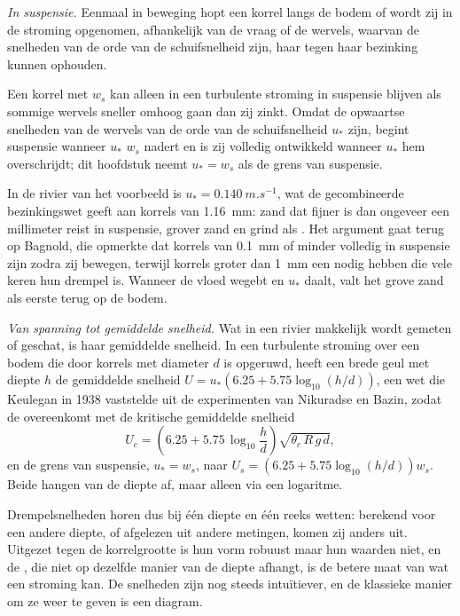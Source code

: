 \emph{In suspensie.} Eenmaal in beweging hopt een korrel langs de bodem of wordt zij in de stroming opgenomen, afhankelijk van de vraag of de wervels, waarvan de snelheden van de orde van de schuifsnelheid zijn, haar tegen haar bezinking kunnen ophouden.

\begin{proposition}\label{prop:b1:erosion-transport:suspension}
Een korrel met  $w_s$ kan alleen in een turbulente stroming in suspensie blijven als sommige wervels sneller omhoog gaan dan zij zinkt. Omdat de opwaartse snelheden van de wervels van de orde van de schuifsnelheid $u_*$ zijn, begint suspensie wanneer $u_*$ $w_s$ nadert en is zij volledig ontwikkeld wanneer $u_*$ hem overschrijdt; dit hoofdstuk neemt $u_* = w_s$ als de grens van suspensie.
\end{proposition}
\admitted

In de rivier van het voorbeeld is $u_* = \qty{0.140}{m.s^{-1}}$, wat de gecombineerde bezinkingswet geeft aan korrels van \qty{1.16}{mm}: zand dat fijner is dan ongeveer een millimeter reist in suspensie, grover zand en grind als . Het argument gaat terug op Bagnold, die opmerkte dat korrels van \qty{0.1}{mm} of minder volledig in suspensie zijn zodra zij bewegen, terwijl korrels groter dan \qty{1}{mm} een  nodig hebben die vele keren hun drempel is. Wanneer de vloed wegebt en $u_*$ daalt, valt het grove zand als eerste terug op de bodem.

\emph{Van spanning tot gemiddelde snelheid.} Wat in een rivier makkelijk wordt gemeten of geschat, is haar gemiddelde snelheid. In een turbulente stroming over een bodem die door korrels met diameter $d$ is opgeruwd, heeft een brede geul met diepte $h$ de gemiddelde snelheid $U = u_*\left(6.25 + 5.75\log_{10}(h/d)\right)$, een wet die Keulegan in 1938 vaststelde uit de experimenten van Nikuradse en Bazin, zodat de  overeenkomt met de kritische gemiddelde snelheid
\[
  U_c = \left(6.25 + 5.75\,\log_{10}\frac{h}{d}\right)\sqrt{\theta_c\,R\,g\,d},
\]
en de grens van suspensie, $u_* = w_s$, naar $U_s = \left(6.25 +
5.75\log_{10}(h/d)\right) w_s$. Beide hangen van de diepte af, maar alleen via een logaritme.

Drempelsnelheden horen dus bij één diepte en één reeks wetten: berekend voor een andere diepte, of afgelezen uit andere metingen, komen zij anders uit. Uitgezet tegen de korrelgrootte is hun vorm robuust maar hun waarden niet, en de , die niet op dezelfde manier van de diepte afhangt, is de betere maat van wat een stroming kan. De snelheden zijn nog steeds intuïtiever, en de klassieke manier om ze weer te geven is een diagram.

